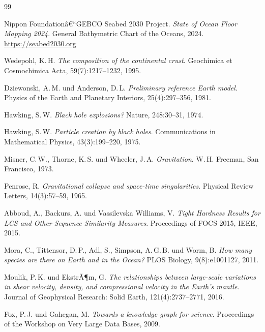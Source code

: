 ﻿\documentclass[a4paper,12pt]{article}
\theoremstyle{definition}
\begin{document}
\newpage
\begin{thebibliography}{99}

Nippon Foundationâ€“GEBCO Seabed 2030 Project.
\textit{State of Ocean Floor Mapping 2024}.
General Bathymetric Chart of the Oceans, 2024.
\url{https://seabed2030.org}

Wedepohl, K.\,H.
\textit{The composition of the continental crust}.
Geochimica et Cosmochimica Acta, 59(7):1217--1232, 1995.

Dziewonski, A.\,M. und Anderson, D.\,L.
\textit{Preliminary reference Earth model}.
Physics of the Earth and Planetary Interiors, 25(4):297--356, 1981.

Hawking, S.\,W.
\textit{Black hole explosions?}
Nature, 248:30--31, 1974.

Hawking, S.\,W.
\textit{Particle creation by black holes}.
Communications in Mathematical Physics, 43(3):199--220, 1975.

Misner, C.\,W., Thorne, K.\,S. und Wheeler, J.\,A.
\textit{Gravitation}.
W.\,H. Freeman, San Francisco, 1973.

Penrose, R.
\textit{Gravitational collapse and space-time singularities}.
Physical Review Letters, 14(3):57--59, 1965.

Abboud, A., Backurs, A. und Vassilevska Williams, V.
\textit{Tight Hardness Results for LCS and Other Sequence Similarity Measures}.
Proceedings of FOCS 2015, IEEE, 2015.

Mora, C., Tittensor, D.\,P., Adl, S., Simpson, A.\,G.\,B. und Worm, B.
\textit{How many species are there on Earth and in the Ocean?}
PLOS Biology, 9(8):e1001127, 2011.

Moulik, P.\,K. und EkstrÃ¶m, G.
\textit{The relationships between large-scale variations in shear velocity,
density, and compressional velocity in the Earth's mantle}.
Journal of Geophysical Research: Solid Earth, 121(4):2737--2771, 2016.

Fox, P.\,J. und Gahegan, M.
\textit{Towards a knowledge graph for science}.
Proceedings of the Workshop on Very Large Data Bases, 2009.


\end{thebibliography}
\end{document}
